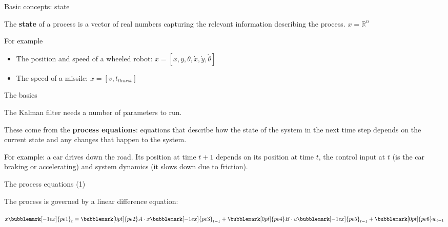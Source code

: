 \documentclass[compress]{beamer}
\begin{document}
\begin{frame}{Basic concepts: state}

The \textbf{state} of a process is a vector of real numbers capturing
    the relevant information describing the process. $x = \mathbb{R}^n$

For example

\begin{itemize}
    \item The position and speed of a wheeled robot: $x=[x, y, \theta, \dot{x}, \dot{y}, \dot{\theta}]$
    \item The speed of a missile: $x=[v, t_{thurst}]$
\end{itemize}

\end{frame}

\begin{frame}{The basics}

The Kalman filter needs a number of parameters to run.

These come from the \textbf{process equations}: equations that describe
how the state of the system in the next time step depends on the
current state and any changes that happen to the system.

\pause

For example: a car drives down the road. Its position at time
$t+1$ depends on its position at time $t$, the control input
at $t$ (is the car braking or accelerating) and system dynamics
(it slows down due to friction).

\end{frame}

\begin{frame}{The process equations (1)}

    The process is governed by a linear difference equation:

    \vspace{4em}

    \Huge\centering
    $x\bubblemark[-1ex]{pe1}_t = \bubblemark[0pt]{pe2}A \cdot x\bubblemark[-1ex]{pe3}_{t-1} + \bubblemark[0pt]{pe4}B \cdot u\bubblemark[-1ex]{pe5}_{t-1} + \bubblemark[0pt]{pe6}w_{t-1}$


\end{frame}
\end{document}

